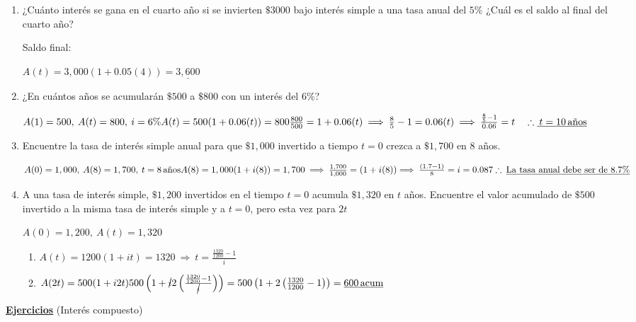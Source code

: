 \begin{enumerate}
\item ¿Cuánto interés se gana en el cuarto año si se invierten $\$ 3000$ bajo interés simple a una tasa anual del $5\%$ ¿Cuál es el saldo al final del cuarto año?

Saldo final:

$A(t) = 3,000(1+0.05(4)) = \underline{3,600}$

\item ¿En cuántos años se acumularán $\$500$ a $\$800$ con un interés del $6\%$?

$A(1) = 500, \: A(t) = 800, \: i = 6\% \\
A(t) = 500 (1 + 0.06(t)) = 800\\
\frac{800}{500} = 1+ 0.06 (t) \: \Longrightarrow \: \frac{8}{5}-1 = 0.06(t) \: \Longrightarrow \: \frac{\frac{8}{5}-1}{0.06} = t \quad  \therefore\underline{\: t = 10 \, \text{años}} $

\item Encuentre la tasa de interés simple anual para que $\$ 1,000$ invertido a tiempo $t = 0$ crezca a $\$1,700$ en 8 años.

$A(0) = 1,000, \: A(8) = 1,700, \: t=8 \, \text{años}\\
A(8) = 1,000(1+i(8)) = 1,700 \: \Longrightarrow \: \frac{1,700}{1,000} = (1+i(8))\\
\Longrightarrow \: \frac{(1.7-1)}{8} = i = 0.087\\
\therefore \: \underline{\text{La tasa anual debe ser de } 8.7\%}$

\item A una tasa de interés simple, $\$ 1,200$ invertidos en el tiempo $t = 0$ acumula $\$1,320$ en $t$ años. Encuentre el valor acumulado de $\$500$ invertido a la misma tasa de interés simple y a $t = 0$, pero esta vez para $2t$

$A(0) = 1,200, \: A(t) = 1,320$
\begin{enumerate}
\item $A(t) = 1200(1+it) = 1320 \: \Longrightarrow \: t = \frac{\frac{1320}{1200}-1}{i}$
\item $A(2t) = 500(1+i2t)\\
500\left( 1+\cancel{i}2\left( \frac{\frac{1320}{1200}-1}{\cancel{i}}\right) \right) = 500 \left( 1 + 2 \left( \frac{1320}{1200} -1\right) \right) = \underline{600\, \text{acum}}  $
\end{enumerate}
\end{enumerate}

\textbf{\underline{Ejercicios}} (Interés compuesto)

